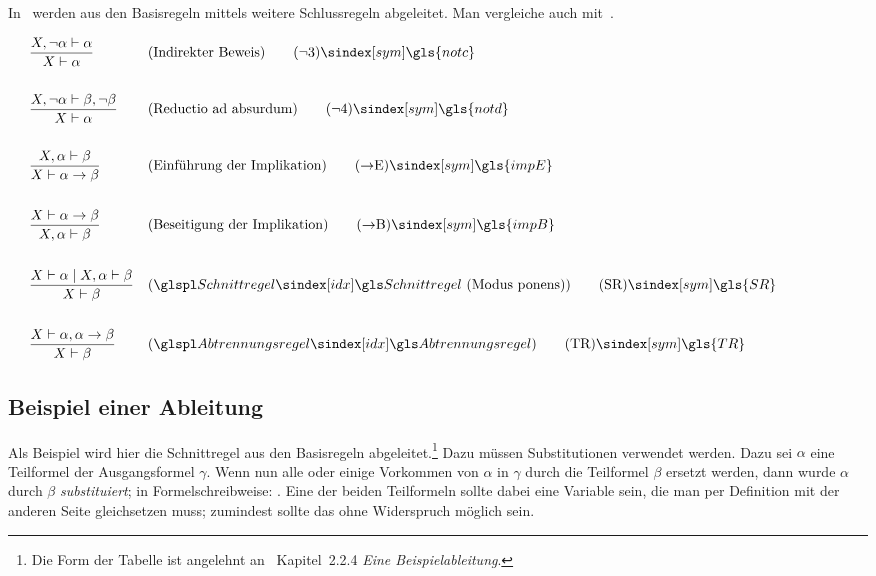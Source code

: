 In~\cite{bib:Rautenberg} werden aus den Basisregeln mittels  weitere Schlussregeln abgeleitet. Man vergleiche auch mit~\cite{bib:NatuerlichesSchliessen}.

\begin{align}
	& & & \frac{X,\lnot\alpha\abltb\alpha}{X\abltb\alpha}
	& & (\text{Indirekter Beweis})
	\tag{\tagnotc} \sym{\gls{notc}} \label{def:notc}
	\\\\
	& & & \frac{X,\lnot\alpha\abltb\beta,\lnot\beta}{X\abltb\alpha}
	& & (\text{Reductio ad absurdum})
	\tag{\tagnotd} \sym{\gls{notd}} \label{def:notd}
	\\\\
	& & & \frac{X,\alpha\abltb\beta}{X\abltb\alpha\limp\beta}
	& & (\text{Einführung der Implikation})
	\tag{\tagimpE} \sym{\gls{impE}} \label{def:impE}
	\\\\
	& & & \frac{X\abltb\alpha\limp\beta}{X,\alpha\abltb\beta}
	& & (\text{Beseitigung der Implikation})
	\tag{\tagimpB} \sym{\gls{impB}} \label{def:impB}
	\\\\
	& & & \frac{X\abltb\alpha \mid X,\alpha\abltb\beta}{X\abltb\beta}
	& & (\glsIdxPl{Schnittregel}\text{ (Modus ponens)})
	\tag{\tagSR} \sym{\gls{SR}} \label{def:SR}
	\\\\
	& & & \frac{X\abltb\alpha,\alpha\limp\beta}{X\abltb\beta}
	& & (\glsIdxPl{Abtrennungsregel})
	\tag{\tagTR} \sym{\gls{TR}} \label{def:TR}
	\formulatoleft
\end{align}

\subsection{Beispiel einer Ableitung}%
\label{sub:BeispielAbleitung}

Als Beispiel wird hier die Schnittregel aus den Basisregeln abgeleitet.\footnote{%
	Die Form der Tabelle ist angelehnt an~\cite{bib:NatuerlichesSchliessen} Kapitel~2.2.4 \emph{Eine Beispielableitung}.%
}
Dazu müssen Substitutionen verwendet werden.
Dazu sei $\alpha$ eine Teilformel der Ausgangsformel $\gamma$.
Wenn nun alle oder einige Vorkommen von $\alpha$ in $\gamma$ durch die Teilformel $\beta$ ersetzt werden, dann wurde $\alpha$ durch $\beta$ \emph{substituiert}; in Formelschreibweise: \forqt{$\alpha\subst\beta$}.
Eine der beiden Teilformeln sollte dabei eine Variable sein, die man per Definition mit der anderen Seite gleichsetzen muss; zumindest sollte das ohne Widerspruch möglich sein.

